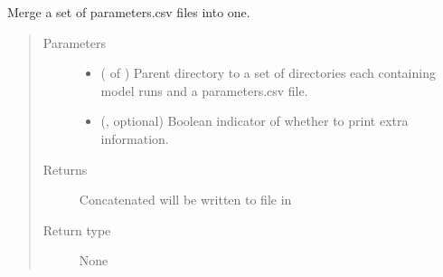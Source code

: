 \documentclass[letterpaper,10pt,english]{sphinxmanual}
\begin{document}
\begin{fulllineitems}
\label{\detokenize{misc:bayescmd.results_handling.data_merge}}
Merge a set of parameters.csv files into one.
\begin{quote}\begin{description}
\item[{Parameters}] \leavevmode\begin{itemize}
\item {} 
 ( of ) \textendash{} Parent directory to a set of directories each containing model runs and
a parameters.csv file.

\item {} 
 (, optional) \textendash{} Boolean indicator of whether to print extra information.

\end{itemize}

\item[{Returns}] \leavevmode
Concatenated will be written to file in 

\item[{Return type}] \leavevmode
None

\end{description}\end{quote}

\end{fulllineitems}

\end{document}
